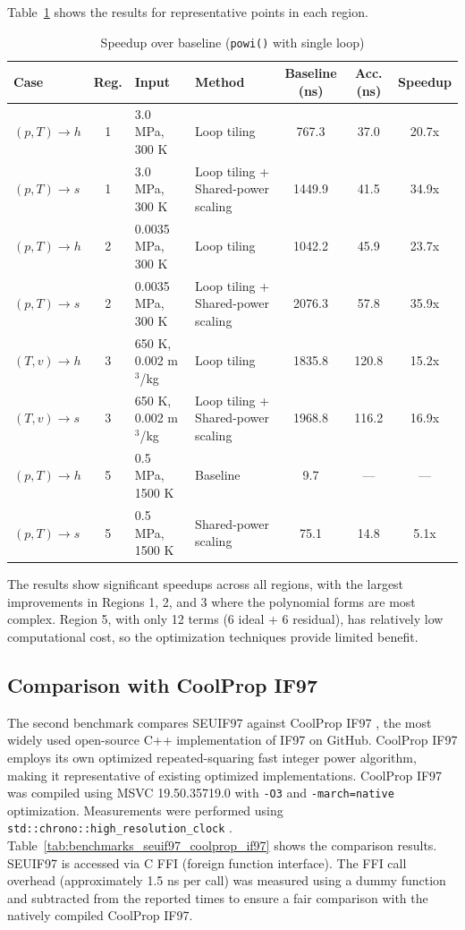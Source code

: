 \documentclass{article}
\begin{document}
Table~\ref{tab:benchmarks} shows the results for representative points in each region.
\begin{table}[H]
\centering
\small
\caption{Speedup over baseline (\texttt{powi()} with single loop)}
\label{tab:benchmarks}
\begin{tabular}{@{}lcllccc@{}}
\toprule
\textbf{Case} & \textbf{Reg.} & \textbf{Input} & \textbf{Method} & \textbf{Baseline (ns)} & \textbf{Acc. (ns)} & \textbf{Speedup} \\
\midrule
$(p,T)\!\rightarrow\!h$ & 1 & 3.0 MPa, 300 K & Loop tiling & 767.3 & 37.0 & 20.7x \\
$(p,T)\!\rightarrow\!s$ & 1 & 3.0 MPa, 300 K & Loop tiling + Shared-power scaling & 1449.9 & 41.5 & 34.9x \\
$(p,T)\!\rightarrow\!h$ & 2 & 0.0035 MPa, 300 K & Loop tiling & 1042.2 & 45.9 & 23.7x \\
$(p,T)\!\rightarrow\!s$ & 2 & 0.0035 MPa, 300 K & Loop tiling + Shared-power scaling & 2076.3 & 57.8 & 35.9x \\
$(T,v)\!\rightarrow\!h$ & 3 & 650 K, 0.002 m$^3$/kg & Loop tiling & 1835.8 & 120.8 & 15.2x \\
$(T,v)\!\rightarrow\!s$ & 3 & 650 K, 0.002 m$^3$/kg & Loop tiling + Shared-power scaling & 1968.8 & 116.2 & 16.9x \\
$(p,T)\!\rightarrow\!h$ & 5 & 0.5 MPa, 1500 K & Baseline & 9.7 & --- & --- \\
$(p,T)\!\rightarrow\!s$ & 5 & 0.5 MPa, 1500 K & Shared-power scaling & 75.1 & 14.8 & 5.1x \\
\bottomrule
\end{tabular}
\end{table}

The results show significant speedups across all regions, with the largest improvements in Regions 1, 2, and 3 where the polynomial forms are most complex. Region 5, with only 12 terms (6 ideal + 6 residual), has relatively low computational cost, so the optimization techniques provide limited benefit.

\subsection{Comparison with CoolProp IF97}

The second benchmark compares SEUIF97 against CoolProp IF97 \cite{CoolPropIF97}, the most widely used open-source C++ implementation of IF97 on GitHub. CoolProp IF97 employs its own optimized repeated-squaring fast integer power algorithm, making it representative of existing optimized implementations.
CoolProp IF97 was compiled using MSVC 19.50.35719.0 with \texttt{-O3} and \texttt{-march=native} optimization. Measurements were performed using \texttt{std::chrono::high\_resolution\_clock} \cite{MusserClock2024}.
Table~\ref{tab:benchmarks_seuif97_coolprop_if97} shows the comparison results.
SEUIF97 is accessed via C FFI (foreign function interface). The FFI call overhead (approximately 1.5 ns per call) was measured using a dummy function and subtracted from the reported times to ensure a fair comparison with the natively compiled CoolProp IF97.
\end{document}
